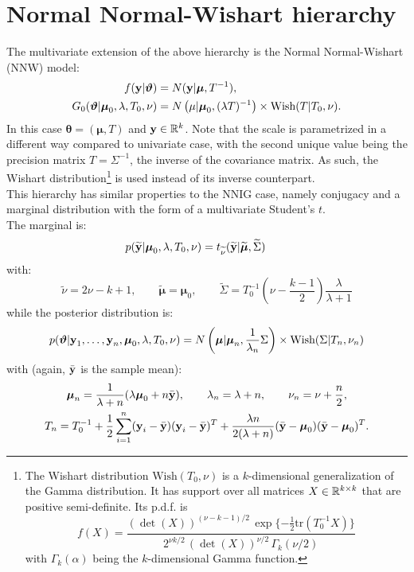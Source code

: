 \section{Normal Normal-Wishart hierarchy} \label{nnw}
The multivariate extension of the above hierarchy is the Normal Normal-Wishart (NNW) model:
\begin{equation}
	\begin{aligned}
		f(\textbf y|\boldsymbol\theta) &= N(\textbf y | \boldsymbol\mu ,T^{-1}), \\
		G_0(\boldsymbol\theta|\boldsymbol \mu_0, \lambda, T_0, \nu)
		&= N\left(\mu | \boldsymbol\mu_0, (\lambda T)^{-1}\right) \times \text{Wish}(T|T_0, \nu).
	\end{aligned}
\end{equation}
In this case $\boldsymbol\theta=(\boldsymbol\mu, T)$ and $\textbf y \in \RR^k$.
Note that the scale is parametrized in a different way compared to univariate case, with the second unique value being the precision matrix $T = \Sigma^{-1}$, the inverse of the covariance matrix.
As such, the Wishart distribution\footnote{The Wishart distribution $\text{Wish}(T_0, \nu)$ is a $k$-dimensional generalization of the Gamma distribution.
It has support over all matrices $X \in \RR^{k \times k}$ that are positive semi-definite.
Its p.d.f. is
$$f(X) = \frac{ (\det(X))^{(\nu-k-1)/2} \, \exp\{-\frac{1}{2} \text{tr}(T_0^{-1} X)\} }{ 2^{\nu k/2} \, (\det(X))^{\nu/2} \, \Gamma_k(\nu/2) } $$
with $\Gamma_k(\alpha)$ being the $k$-dimensional Gamma function.} is used instead of its inverse counterpart. \\
This hierarchy has similar properties to the NNIG case, namely conjugacy and a marginal distribution with the form of a multivariate Student's $t$. \\
The marginal is:
$$ p(\widetilde{\textbf y} | \boldsymbol\mu_0, \lambda, T_0, \nu) = t_{\widetilde\nu} (\widetilde{\textbf y} | \widetilde{\boldsymbol\mu}, \widetilde\Sigma) \qquad
$$
with:
$$ \widetilde{\nu} = 2\nu - k + 1, \qquad \widetilde{\boldsymbol{\mu}} = \boldsymbol{\mu}_0, \qquad
\widetilde{\Sigma} = T_0^{-1} \left(\nu - \frac{k-1}{2}\right) \frac{\lambda}{\lambda+1}
$$
while the posterior distribution is:
\begin{align*}
p(\boldsymbol\theta|\textbf y_1,\dots,\textbf y_n,\boldsymbol\mu_0,\lambda, T_0, \nu)=N\left(\boldsymbol\mu | \boldsymbol\mu_n, \frac{1}{\lambda_n}\Sigma\right) \times \text{Wish}(\Sigma|T_n, \nu_n)
\end{align*}
with  (again, $\bar{\textbf y}$ is the sample mean):
\begin{gather*}
\boldsymbol\mu_n = \frac{1}{\lambda+n} (\lambda\boldsymbol \mu_0 + n \bar{\textbf y}), \qquad \lambda_n = \lambda + n, \qquad \nu_n = \nu + \frac{n}{2}, \\
T_n = T_0^{-1} + \frac{1}{2}\sum_{i=1}^{n} (\textbf y_i-\bar{\textbf y})(\textbf y_i-\bar{\textbf y})^T + \frac{\lambda n}{2(\lambda + n)}(\bar{\textbf y}-\boldsymbol\mu_0)(\bar{\textbf y}-\boldsymbol\mu_0)^T.
\end{gather*}
